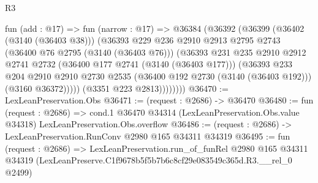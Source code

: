 \begin{lexlean}{R3}
\begin{coremodule}
              fun (add : @17) =>
              fun (narrow : @17) =>
              @36384
                (@36392
                  (@36399
                    (@36402 (@3140 (@36403 @38)))
                    (@36393
                      @229
                      @236
                      @2910
                      @2913
                      @2795
                      @2743
                      (@36400 @76 @2795 (@3140 (@36403 @76)))
                      (@36393
                        @231
                        @235
                        @2910
                        @2912
                        @2741
                        @2732
                        (@36400 @177 @2741 (@3140 (@36403 @177)))
                        (@36393
                          @233
                          @204
                          @2910
                          @2910
                          @2730
                          @2535
                          (@36400 @192 @2730 (@3140 (@36403 @192)))
                          (@3160 @36372)))))
                  (@3351 @223 @2813))))))))
@36470 := LexLeanPreservation.Obs
@36471 := (request : @2686) -> @36470
@36480 := fun (request : @2686) =>
  cond.{1} @36470 @34314 (LexLeanPreservation.Obs.value @34318) LexLeanPreservation.Obs.overflow
@36486 := (request : @2686) -> LexLeanPreservation.RunConv @2980 @165 @34311 @34319
@36495 := fun (request : @2686) =>
  LexLeanPreservation.run_of_funRel
    @2980
    @165
    @34311
    @34319
    (LexLeanPreserve.C1f9678b5f5b7b6c8cf29e083549c365d.R3.__rel_0 @2499)
\end{coremodule}
\end{lexlean}
